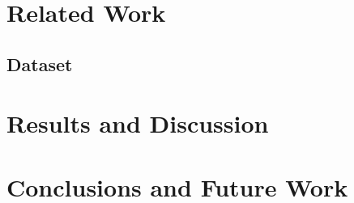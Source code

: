 \documentclass[runningheads]{llncs}
\begin{document}
\section{Related Work}

\subsection{Dataset}



\section{Results and Discussion}


\section{Conclusions and Future Work}
\end{document}
